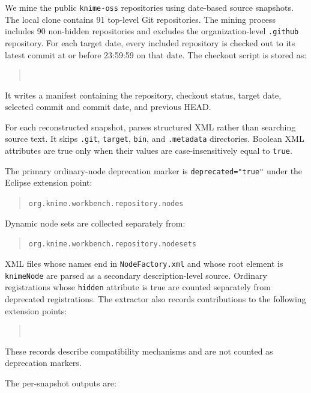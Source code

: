 \documentclass[runningheads]{llncs}
\begin{document}
We mine the public \texttt{knime-oss} repositories using date-based source
snapshots. The local clone contains 91 top-level Git repositories. The mining
process includes 90 non-hidden repositories and excludes the organization-level
\texttt{.github} repository. For each target date, every included repository is
checked out to its latest commit at or before 23:59:59 on that date. The
checkout script is stored as:
\begin{quote}
\\
\end{quote}
It writes a manifest containing the repository, checkout status, target date,
selected commit and commit date, and previous HEAD.

For each reconstructed snapshot, 
parses structured XML rather than searching source text. It skips
\texttt{.git}, \texttt{target}, \texttt{bin}, and \texttt{.metadata}
directories. Boolean XML attributes are true only when their values are
case-insensitively equal to \texttt{true}.

The primary ordinary-node deprecation marker is
\texttt{deprecated="true"} under the Eclipse extension point:

\begin{quote}
\texttt{org.knime.workbench.repository.nodes}
\end{quote}

Dynamic node sets are collected separately from:

\begin{quote}
\texttt{org.knime.workbench.repository.nodesets}
\end{quote}

XML files whose names end in \texttt{NodeFactory.xml} and whose root element is
\texttt{knimeNode} are parsed as a secondary description-level source. Ordinary
registrations whose \texttt{hidden} attribute is true are counted separately
from deprecated registrations. The extractor also records contributions to the
following extension points:
\begin{quote}
\\
\end{quote}
These records describe compatibility mechanisms and are not counted as
deprecation markers.

The per-snapshot outputs are:
\end{document}
